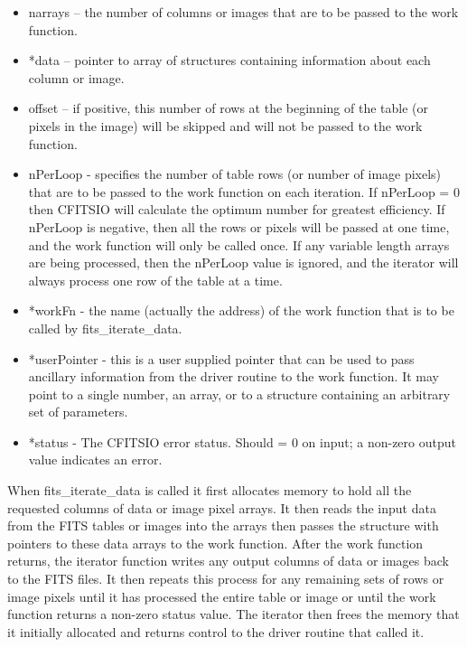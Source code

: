 \documentclass[11pt]{book}
\begin{document}
\begin{itemize}
\item

   narrays    -- the number of columns or images that are to be passed
                 to the work function.
\item
   *data --     pointer to array of structures containing information
                about each column or image.

\item
   offset      -- if positive, this number of rows at the
                      beginning of the table (or pixels in the image)
                      will be skipped and will not be passed to the work
                      function.

\item
   nPerLoop   - specifies the number of table rows (or number of
                    image pixels) that are to be passed to the work
                    function on each iteration.  If nPerLoop = 0
                    then CFITSIO will calculate the optimum number
                    for greatest efficiency.
                    If nPerLoop is negative, then all the rows
                    or pixels will be passed at one time, and the work
                    function will only be called once.  If any variable
		    length arrays are being processed, then the nPerLoop
		    value is ignored, and the iterator will always process
		    one row of the table at a time.

\item
   *workFn     - the name (actually the address) of the work function
                 that is to be called by fits\_iterate\_data.

\item
   *userPointer - this is a user supplied pointer that can be used
                  to pass ancillary information from the driver routine
                  to the work function.  It may point to a single number,
                  an array, or to a structure containing an arbitrary set
                  of parameters.

\item
   *status      - The CFITSIO error status.  Should = 0 on input;
                  a non-zero output value indicates an error.
\end{itemize}

When fits\_iterate\_data is called it first allocates memory to hold
all the requested columns of data or image pixel arrays.  It then reads
the input data from the FITS tables or images into the arrays then
passes the structure with pointers to these data arrays to the work
function.  After the work function returns, the iterator function
writes any output columns of data or images back to the FITS files.  It
then repeats this process for any remaining sets of rows or image
pixels until it has processed the entire table or image or until the
work function returns a non-zero status value.  The iterator then frees
the memory that it initially allocated and returns control to the
driver routine that called it.
\end{document}
